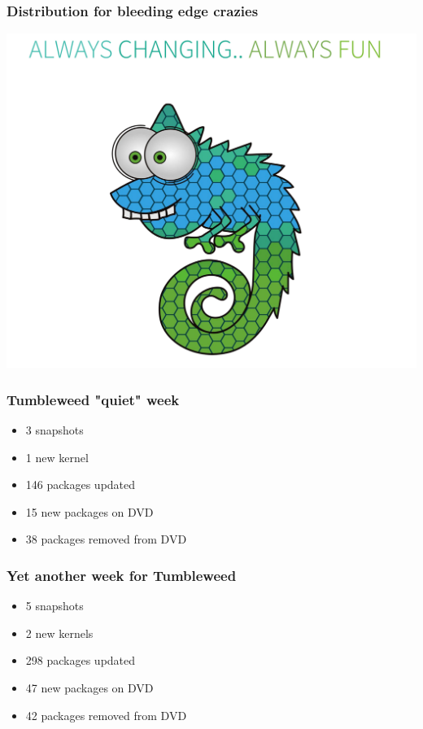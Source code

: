 \documentclass{beamer}
\begin{document}

\begin{frame}[t]
\frametitle{Distribution for bleeding edge crazies}
\begin{center}
\includegraphics[height=.7\paperheight]{always-changing}
\end{center}
\end{frame}

\begin{frame}[t]
\frametitle{Tumbleweed "quiet" week}
\begin{itemize}
\item 3 snapshots
\item 1 new kernel
\item 146 packages updated
\item 15 new packages on DVD
\item 38 packages removed from DVD
\end{itemize}
\end{frame}

\begin{frame}[t]
\frametitle{Yet another week for Tumbleweed}
\begin{itemize}
\item 5 snapshots
\item 2 new kernels
\item 298 packages updated
\item 47 new packages on DVD
\item 42 packages removed from DVD
\end{itemize}
\end{frame}
\end{document}
